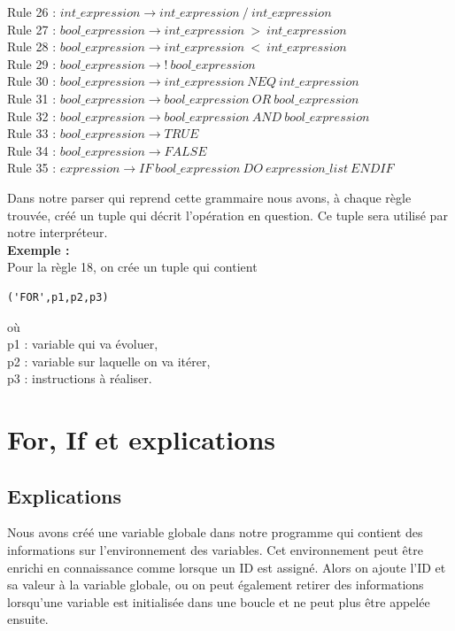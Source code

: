 \documentclass[10pt,a4paper]{article}
\begin{document}
\begin{flushleft}
Rule 26 : $int\_expression \rightarrow int\_expression\ /\ int\_expression$\\
Rule 27 : $bool\_expression \rightarrow int\_expression\ >\ int\_expression$\\
Rule 28 : $bool\_expression \rightarrow int\_expression\ <\ int\_expression$\\
Rule 29 : $bool\_expression \rightarrow !\ bool\_expression$\\
Rule 30 : $bool\_expression \rightarrow int\_expression\ NEQ\ int\_expression$\\
Rule 31 : $bool\_expression \rightarrow bool\_expression\ OR\ bool\_expression$\\
Rule 32 : $bool\_expression \rightarrow bool\_expression\ AND\ bool\_expression$\\
Rule 33 : $bool\_expression \rightarrow TRUE$\\
Rule 34 : $bool\_expression \rightarrow FALSE$\\
Rule 35 : $expression \rightarrow IF\ bool\_expression\ DO\ expression\_list\ ENDIF$\\
\end{flushleft}

Dans notre parser qui reprend cette grammaire nous avons, à chaque règle trouvée, créé un tuple qui décrit l'opération en question. Ce tuple sera utilisé par notre interpréteur. \\


\textbf{Exemple :}\\
Pour la règle 18, on crée un tuple qui contient 
\begin{verbatim}
('FOR',p1,p2,p3)
\end{verbatim}
où \\p1 : variable qui va évoluer,\\ p2 : variable sur laquelle on va itérer,\\ p3 : instructions à réaliser. 

\section{For, If et explications}
\subsection{Explications}
Nous avons créé une variable globale dans notre programme qui contient des informations sur l'environnement des variables.
Cet environnement peut être enrichi en connaissance comme lorsque un ID est assigné. Alors on ajoute l'ID et sa valeur à la variable globale, ou on peut également retirer des informations lorsqu'une variable est initialisée dans une boucle et ne peut plus être appelée ensuite.
\end{document}

